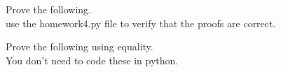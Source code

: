 \documentclass{exam}
\def\lnot{\neg}             %
\def\proves{\vdash}
\begin{document}
\begin{questions}


\question
Prove the following.\\
use the homework4.py file to verify that the proofs are correct.


\question
Prove the following using equality.\\
You don't need to code these in python.
\end{questions}
\end{document}
